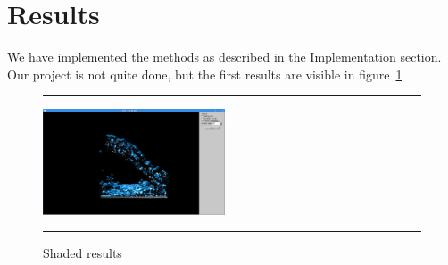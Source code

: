 \section{Results}
We have implemented the methods as described in the Implementation section.
Our project is not quite done, but the first results are visible in figure~\ref{fig:res}


\begin{figure}[!th]
\hrule
\begin{center}
\vspace*{2ex}\includegraphics[width=0.48\textwidth]{pictures/colors.png}
\end{center}
\caption{Shaded results}
\label{fig:res} 
\vspace*{2ex}
\hrule
\end{figure}